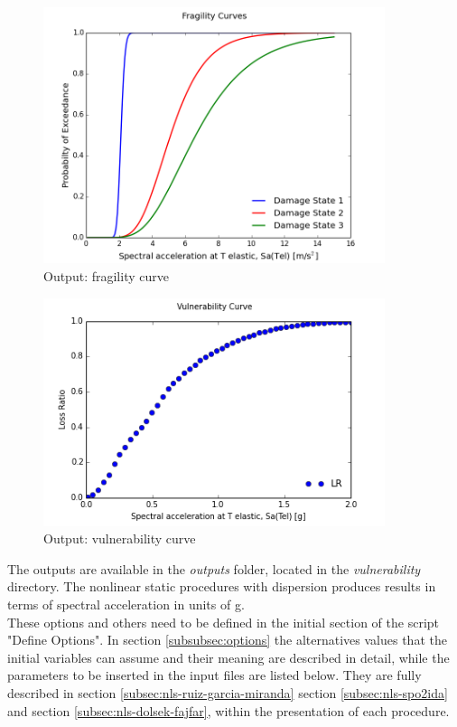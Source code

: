 \begin{figure}[!htbp]
\centering
\includegraphics[width=10cm]{./figures/fragility.png}
\caption{Output: fragility curve}
\label{fig:expFragility}
\end{figure}

\begin{figure}[!htbp]
\centering
\includegraphics[width=10cm]{./figures/vulnerability.png}
\caption{Output: vulnerability curve}
\label{fig:expVulnerability}
\end{figure}

The outputs are available in the \textit{outputs} folder, located in the \textit{vulnerability} directory. The nonlinear static procedures with dispersion produces results in terms of spectral acceleration in units of g.\\
These options and others need to be defined in the initial section of the script "Define Options". In section \ref{subsubsec:options} the alternatives values that the initial variables can assume and their meaning are described in detail, while the parameters to be inserted in the input files are listed below. They are fully described in section \ref{subsec:nls-ruiz-garcia-miranda} section \ref{subsec:nls-spo2ida} and section  \ref{subsec:nls-dolsek-fajfar}, within the presentation of each procedure.

